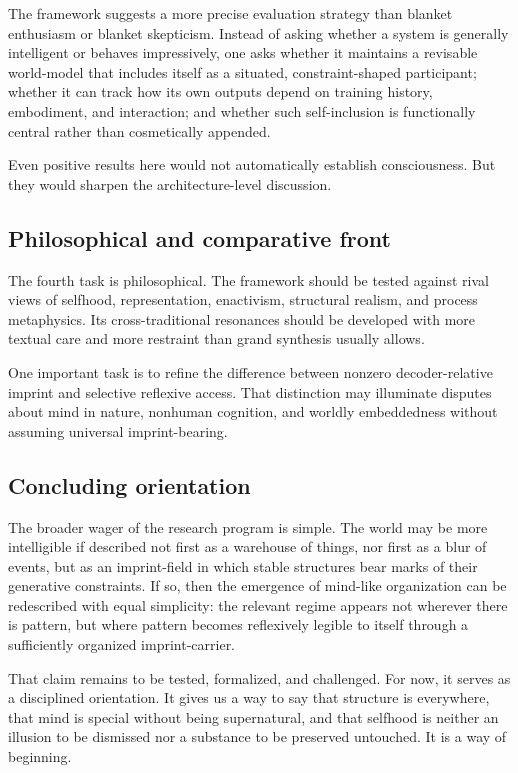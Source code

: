 \documentclass[12pt,a4paper]{article}
\begin{document}
The framework suggests a more precise evaluation strategy than blanket enthusiasm or blanket skepticism. Instead of asking whether a system is generally intelligent or behaves impressively, one asks whether it maintains a revisable world-model that includes itself as a situated, constraint-shaped participant; whether it can track how its own outputs depend on training history, embodiment, and interaction; and whether such self-inclusion is functionally central rather than cosmetically appended.

Even positive results here would not automatically establish consciousness. But they would sharpen the architecture-level discussion.

\subsection{Philosophical and comparative front}

The fourth task is philosophical. The framework should be tested against rival views of selfhood, representation, enactivism, structural realism, and process metaphysics. Its cross-traditional resonances should be developed with more textual care and more restraint than grand synthesis usually allows.

One important task is to refine the difference between nonzero
decoder-relative imprint and selective reflexive access. That distinction
may illuminate disputes about mind in nature, nonhuman cognition, and
worldly embeddedness without assuming universal imprint-bearing.

\subsection{Concluding orientation}

The broader wager of the research program is simple. The world may be more intelligible if described not first as a warehouse of things, nor first as a blur of events, but as an imprint-field in which stable structures bear marks of their generative constraints. If so, then the emergence of mind-like organization can be redescribed with equal simplicity: the relevant regime appears not wherever there is pattern, but where pattern becomes reflexively legible to itself through a sufficiently organized imprint-carrier.

That claim remains to be tested, formalized, and challenged. For now, it serves as a disciplined orientation. It gives us a way to say that structure is everywhere, that mind is special without being supernatural, and that selfhood is neither an illusion to be dismissed nor a substance to be preserved untouched. It is a way of beginning.
\end{document}
